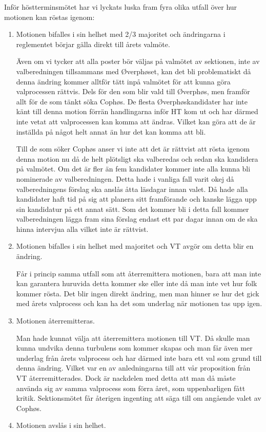 \documentclass[../_main/handlingar.tex]{subfiles}
\begin{document}
Inför höstterminsmötet har vi lyckats luska fram fyra olika utfall över hur motionen kan röstas igenom:
\begin{enumerate}
    \item Motionen bifalles i sin helhet med 2/3 majoritet och ändringarna i reglementet börjar gälla direkt till årets valmöte.

    Även om vi tycker att alla poster bör väljas på valmötet av sektionen, inte av valberedningen tillsammans med Øverphøset, kan det bli problematiskt då denna ändring kommer alltför tätt inpå valmötet för att kunna göra valprocessen rättvis. Dels för den som blir vald till Øverphøs, men framför allt för de som tänkt söka Cophøs. De flesta Øverphøskandidater har inte känt till denna motion förrän handlingarna inför HT kom ut och har därmed inte vetat att valprocessen kan komma att ändras. Vilket kan göra att de är inställda på något helt annat än hur det kan komma att bli.

    Till de som söker Cophøs anser vi inte att det är rättvist att rösta igenom denna motion nu då de helt plötsligt ska valberedas och sedan ska kandidera på valmötet. Om det är fler än fem kandidater kommer inte alla kunna bli nominerade av valberedningen. Detta hade i vanliga fall varit okej då valberedningens förslag ska anslås åtta läsdagar innan valet. Då hade alla kandidater haft tid på sig att planera sitt framförande och kanske lägga upp sin kandidatur på ett annat sätt. Som det kommer bli i detta fall kommer valberedningen lägga fram sina förslag endast ett par dagar innan om de ska hinna intervjua alla vilket inte är rättvist. 
    \item Motionen bifalles i sin helhet med majoritet och VT avgör om detta blir en ändring.

    Får i princip samma utfall som att återremittera motionen, bara att man inte kan garantera huruvida detta kommer ske eller inte då man inte vet hur folk kommer rösta. Det blir ingen direkt ändring, men man hinner se hur det gick med årets valprocess och kan ha det som underlag när motionen tas upp igen.
    \newpage
    \item Motionen återremitteras.

    Man hade kunnat välja att återremittera motionen till VT. Då skulle man kunna undvika denna turbulens som kommer skapas och man får även mer underlag från årets valprocess och har därmed inte bara ett val som grund till denna ändring. Vilket var en av anledningarna till att vår proposition från VT återremitterades. Dock är nackdelen med detta att man då måste använda sig av samma valprocess som förra året, som uppenbarligen fått kritik. Sektionsmötet får återigen ingenting att säga till om angående valet av Cophøs.
    \item Motionen avslås i sin helhet.


\end{enumerate}
\end{document}
